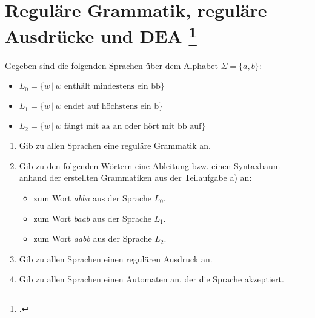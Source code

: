\documentclass{lehramt-informatik-aufgabe}
\begin{document}
\section{Reguläre Grammatik, reguläre Ausdrücke und DEA
\footcite{theoinf:ab:1}}

Gegeben sind die folgenden Sprachen über dem Alphabet $\Sigma = \{a, b\}$:

\begin{itemize}
\item $L_0 = \{w \,|\, w \text{ enthält mindestens ein bb}\}$
\item $L_1 = \{w \,|\, w \text{ endet auf höchstens ein b}\}$
\item $L_2 = \{w \,|\, w \text{ fängt mit aa an oder hört mit bb auf}\}$
\end{itemize}
\begin{enumerate}


\item Gib zu allen Sprachen eine reguläre Grammatik an.


\item Gib zu den folgenden Wörtern eine Ableitung bzw. einen Syntaxbaum
anhand der erstellten Grammatiken aus der Teilaufgabe a) an:

\begin{itemize}
\item zum Wort \emph{abba} aus der Sprache $L_0$.
\item zum Wort \emph{baab} aus der Sprache $L_1$.
\item zum Wort \emph{aabb} aus der Sprache $L_2$.
\end{itemize}


\item Gib zu allen Sprachen einen regulären Ausdruck an.


\item Gib zu allen Sprachen einen Automaten an, der die Sprache
akzeptiert.

\end{enumerate}
\end{document}
